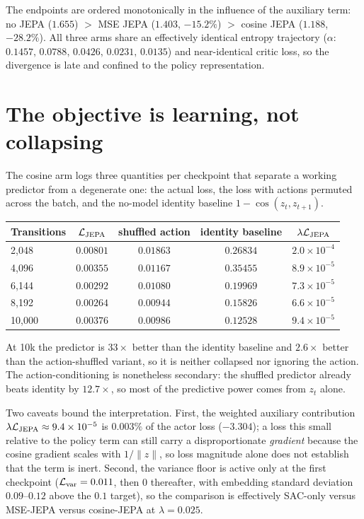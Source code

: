 \documentclass[11pt]{article}
\begin{document}
\noindent
The endpoints are ordered monotonically in the influence of the auxiliary term:
no JEPA ($1.655$) $>$ MSE JEPA ($1.403$, $-15.2\%$) $>$ cosine JEPA
($1.188$, $-28.2\%$). All three arms share an effectively identical entropy
trajectory ($\alpha$: $0.1457,\,0.0788,\,0.0426,\,0.0231,\,0.0135$) and
near-identical critic loss, so the divergence is late and confined to the
policy representation.

\section{The objective is learning, not collapsing}

The cosine arm logs three quantities per checkpoint that separate a working
predictor from a degenerate one: the actual loss, the loss with actions
permuted across the batch, and the no-model identity baseline
$1-\cos(z_t,z_{t+1})$.

\begin{center}
\begin{tabular}{lcccc}
\toprule
\textbf{Transitions} & $\mathcal L_{\rm JEPA}$ & shuffled action & identity baseline & $\lambda\mathcal L_{\rm JEPA}$ \\
\midrule
2{,}048  & $0.00801$ & $0.01863$ & $0.26834$ & $2.0\times10^{-4}$ \\
4{,}096  & $0.00355$ & $0.01167$ & $0.35455$ & $8.9\times10^{-5}$ \\
6{,}144  & $0.00292$ & $0.01080$ & $0.19969$ & $7.3\times10^{-5}$ \\
8{,}192  & $0.00264$ & $0.00944$ & $0.15826$ & $6.6\times10^{-5}$ \\
10{,}000 & $0.00376$ & $0.00986$ & $0.12528$ & $9.4\times10^{-5}$ \\
\bottomrule
\end{tabular}
\end{center}

\noindent
At 10k the predictor is $33\times$ better than the identity baseline and
$2.6\times$ better than the action-shuffled variant, so it is neither
collapsed nor ignoring the action. The action-conditioning is nonetheless
secondary: the shuffled predictor already beats identity by $12.7\times$, so
most of the predictive power comes from $z_t$ alone.

Two caveats bound the interpretation. First, the weighted auxiliary
contribution $\lambda\mathcal L_{\rm JEPA}\approx9.4\times10^{-5}$ is
$0.003\%$ of the actor loss ($-3.304$); a loss this small relative to the
policy term can still carry a disproportionate \emph{gradient} because the
cosine gradient scales with $1/\lVert z\rVert$, so loss magnitude alone does
not establish that the term is inert. Second, the variance floor is active only
at the first checkpoint ($\mathcal L_{\rm var}=0.011$, then $0$ thereafter, with
embedding standard deviation $0.09$--$0.12$ above the $0.1$ target), so the
comparison is effectively SAC-only versus MSE-JEPA versus cosine-JEPA at
$\lambda=0.025$.
\end{document}
